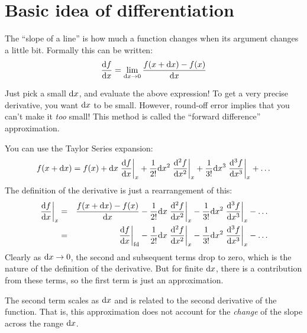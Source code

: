 \section{Basic idea of differentiation}


\begin{answer}
The ``slope of a line'' is how much a function changes when its
argument changes a little bit. Formally this can be written:
\begin{equation}
\frac{{\rm d}f}{{\rm d}x} = \lim_{{\rm d}x \rightarrow 0} \frac{f(x+{\rm d}x)
  - f(x)}{{\rm d}x}
\end{equation}
\end{answer}


\begin{answer}
  Just pick a small ${\rm d}x$, and evaluate the above expression! To
  get a very precise derivative, you want ${\rm d}x$ to be
  small. However, round-off error implies that you can't make it {\it
    too} small! This method is called the ``forward difference''
  approximation. 
\end{answer}


\begin{answer}
  You can use the Taylor Series expansion:
  \begin{equation}
    f(x + {\rm d}x) = f(x)
    + {\rm d}x \left.\frac{{\rm d}f}{{\rm d}x}\right|_{x} 
    + \frac{1}{2!} {\rm d}x^2 \left.\frac{{\rm d}^2f}{{\rm d}x^2}\right|_{x} 
    + \frac{1}{3!} {\rm d}x^3 \left.\frac{{\rm d}^3f}{{\rm d}x^3}\right|_{x} 
    + \ldots
  \end{equation}
  The definition of the derivative is just a rearrangement of this:
  \begin{eqnarray}
    \left.\frac{{\rm d}f}{{\rm d}x}\right|_{x} &=&
     \frac{f(x+{\rm d}x) - f(x)}{{\rm d}x}
     - \frac{1}{2!} {\rm d}x \left.\frac{{\rm d}^2f}{{\rm d}x^2}\right|_{x} 
     - \frac{1}{3!} {\rm d}x^2 \left.\frac{{\rm d}^3f}{{\rm d}x^3}\right|_{x} 
     - \ldots \cr
    &=&
     \left.\frac{{\rm d}f}{{\rm d}x}\right|_{\rm fd} 
     - \frac{1}{2!} {\rm d}x \left.\frac{{\rm d}^2f}{{\rm d}x^2}\right|_{x} 
     - \frac{1}{3!} {\rm d}x^2 \left.\frac{{\rm d}^3f}{{\rm d}x^3}\right|_{x} 
     - \ldots
  \end{eqnarray}
  Clearly as ${\rm d}x\rightarrow 0$, the second and subsequent terms
  drop to zero, which is the nature of the definition of the
  derivative. But for finite ${\rm d}x$, there is a contribution from
  these terms, so the first term is just an approximation.

  The second term scales as ${\rm d}x$ and is related to the second
  derivative of the function. That is, this approximation does not
  account for the {\it change} of the slope across the range ${\rm
    d}x$.
\end{answer}

